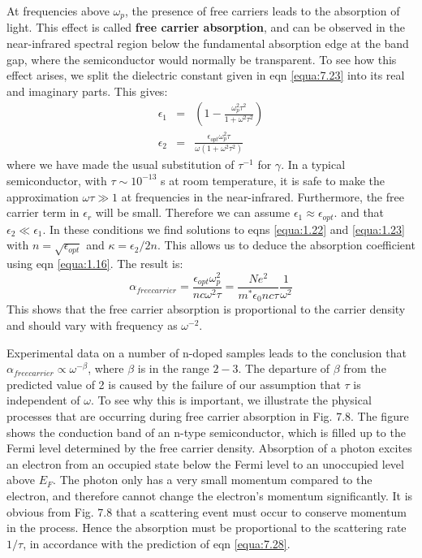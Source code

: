 \documentclass[12pt]{book}
\begin{document}
{At frequencies above $\omega_p$, the presence of free carriers leads to the absorption of light. This effect is called \textbf{free carrier absorption}, and can be observed in the near-infrared spectral region below the fundamental absorption edge at the band gap, where the semiconductor would normally be transparent. To see how this effect arises, we split the dielectric constant given in eqn \ref{equa:7.23} into its real and imaginary parts. This gives:
\begin{eqnarray}
  \epsilon_1 &=& \left(1-\frac{\omega_p^2\tau^2}{1+\omega^2\tau^2}\right)\label{equa:7.26} \\
  \epsilon_2 &=& \frac{\epsilon_{opt}\omega_p^2\tau}{\omega(1+\omega^2\tau^2)} \label{equa:7.27}
\end{eqnarray}
where we have made the usual substitution of $\tau^{-1}$ for $\gamma$. In a typical semiconductor, with $\tau\sim10^{-13}$ s at room temperature, it is safe to make the approximation  $\omega\tau\gg1$ at frequencies in the near-infrared. Furthermore, the free carrier term in $\epsilon_r$ will be small. Therefore we can assume $\epsilon_1\approx\epsilon_{opt}$. and that $\epsilon_2\ll\epsilon_1$. In these conditions we find solutions to eqns \ref{equa:1.22} and \ref{equa:1.23} with $n=\sqrt{\epsilon_{opt}}$ and $\kappa = \epsilon_2/2n$. This allows us to deduce the absorption coefficient using eqn \ref{equa:1.16}. The result is:
\begin{equation}\label{equa:7.28}
  \alpha_{free carrier}=\frac{\epsilon_{opt}\omega_p^2}{nc\omega^2\tau}=\frac{Ne^2}{m^*\epsilon_0nc\tau}\frac{1}{\omega^2}
\end{equation}
This shows that the free carrier absorption is proportional to the carrier density and should vary with frequency as $\omega^{-2}$.

Experimental data on a number of n-doped samples leads to the conclusion that $\alpha_{free carrier}\propto\omega^{-\beta}$, where $\beta$ is in the range $2-3$. The departure of $\beta$ from the predicted value of 2 is caused by the failure of our assumption that $\tau$ is independent of $\omega$. To see why this is important, we illustrate the physical processes that are occurring during free carrier absorption in Fig. 7.8. The figure shows the conduction band of an n-type semiconductor, which is filled up to the Fermi level determined by the free carrier density. Absorption of a photon excites an electron from an occupied state below the Fermi level to an unoccupied level above $E_F$. The photon only has a very small momentum compared to the electron, and therefore cannot change the electron's momentum significantly. It is obvious from Fig. 7.8 that a scattering event must occur to conserve momentum in the process. Hence the absorption must be proportional to the scattering rate $1/\tau$, in accordance with the prediction of eqn \ref{equa:7.28}.

}
\end{document}
